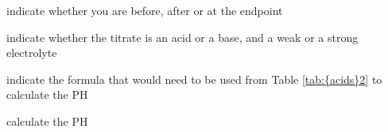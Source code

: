 \documentclass[main.tex]{subfiles}
\newcommand\chapterlabel{acids}
\begin{document}
\begin{description}
\begin{example}
\begin{inparaenum}[(a)]
\item indicate whether you are before, after or at the endpoint
\item indicate whether the titrate is an acid or a base, and a weak or a strong electrolyte
\item indicate the formula that would need to be used from Table \ref{tab:{\chapterlabel}2} to calculate the PH 
\item calculate the PH 
\end{inparaenum}
\end{example}%

%
%
%



\end{description}
\end{document}
